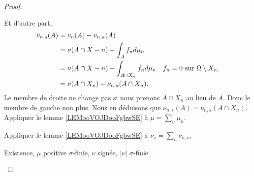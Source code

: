 \begin{proof}
\begin{subproof}
\begin{subproof}
			Et d'autre part,
			\begin{subequations}
				\begin{align}
					\nu_{n,s}(A) & = \nu_n(A)-\nu_{n,a}(A)                                                                       \\
					             & = \nu(A\cap X-n)-\int_A f_nd\mu_n                                                             \\
					             & = \nu(A\cap X-n)-\int_{A\cap X_n} f_nd\mu_n & \text{\( f_n=0\) sur \( \Omega\setminus X_n\).} \\
					             & = \nu(A\cap X_n)-\nu_{n,a}(A\cap X_n).
				\end{align}
			\end{subequations}
			Le membre de droite ne change pas si nous prenons \( A\cap X_n\) au lieu de \( A\). Donc le membre de gauche non plus. Nous en déduisons que \( \nu_{n,s}(A)=\nu_{n,s}(A\cap X_n)\).
			\spitem[\( \nu_{n,s}\perp \mu\)]
			Appliquer le lemme \ref{LEMooVOJDooFgbwSE} à \( \mu=\sum_n\mu_n\).

			\spitem[\( \nu_{s}\perp \mu\)]
			Appliquer le lemme \ref{LEMooVOJDooFgbwSE} à \( \nu_s=\sum_n\nu_{n,s}\).
		\end{subproof}
	\end{subproof}


	\begin{proofpart}
		Existence, \( \mu\) positive \( \sigma\)-finie, \( \nu\) signée, \( | \nu |\) \( \sigma\)-finie
	\end{proofpart}


\end{proof}

